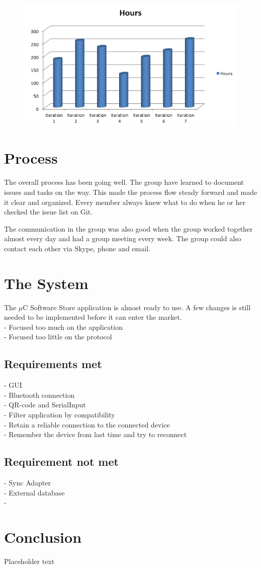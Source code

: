 	\begin{figure}[H]
	\centering
	\label{fig:workhours}
	\includegraphics[scale=0.8]{images/workhours_chart2.png}
	\end{figure}

	\section{Process}
	The overall process has been going well. The group have learned to document issues and tasks on the way. This made the process flow steady forward and made it clear and organized. Every member always knew what to do when he or her checked the issue list on Git.

	The communication in the group was also good when the group worked together almost every day and had a group meeting every week. The group could also contact each other via Skype, phone and email.

	\section{The System}
	The $\mu$C Software Store application is almost ready to use. A few changes is still needed to be implemented before it can enter the market. \\

	- Focused too much on the application\\
	- Focused too little on the protocol

		\subsection{Requirements met}
			- GUI\\
			- Bluetooth connection\\
			- QR-code and SerialInput\\
			- Filter application by compatibility\\
			- Retain a reliable connection to the connected device\\
			- Remember the device from last time and try to reconnect\\

		\subsection{Requirement not met}
			- Sync Adapter\\
			- External database\\
			-

	\section{Conclusion}
    Placeholder text
